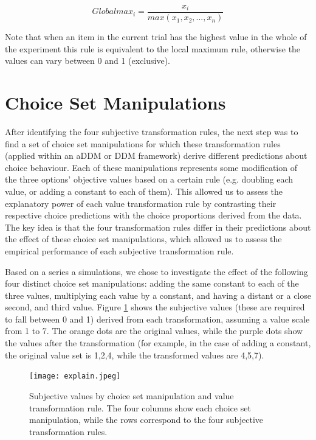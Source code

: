 \documentclass[11pt,a4paper]{article}
\begin{document}
\begin{equation}
Globalmax_{i}=\frac{x_i}{max(x_1,x_2,...,x_n)}
\label{eq:globmax}
\end{equation}

Note that when an item in the current trial has the highest value in the whole of the experiment this rule is equivalent to the local maximum rule, otherwise the values can vary between 0 and 1 (exclusive). 

\section{Choice Set Manipulations} \label{chap1choicesetman}

After identifying the four subjective transformation rules, the next step was to find a set of choice set manipulations for which these transformation rules (applied within an aDDM or DDM framework) derive different predictions about choice behaviour. Each of these manipulations represents some modification of the three options' objective values based on a certain rule (e.g. doubling each value, or adding a constant to each of them). This allowed us to assess the explanatory power of each value transformation rule by contrasting their respective choice predictions with the choice proportions derived from the data. The key idea is that the four transformation rules differ in their predictions about the effect of these choice set manipulations, which allowed us to assess the empirical performance of each subjective transformation rule.

Based on a series a simulations, we chose to investigate the effect of the following four distinct choice set manipulations: adding the same constant to each of the three values, multiplying each value by a constant, and having a distant or a close second, and third value. Figure \ref{fig:choicesetmanip} shows the subjective values (these are required to fall between 0 and 1) derived from each transformation, assuming a value scale from 1 to 7. The orange dots are the original values, while the purple dots show the values after the transformation (for example, in the case of adding a constant, the original value set is 1,2,4, while the transformed values are 4,5,7).

\begin{figure}
\captionsetup{justification=centering}
\centering
\caption{Subjective values by choice set manipulation and value transformation rule. The four columns show each choice set manipulation, while the rows correspond to the four subjective transformation rules.}
\texttt{[image: explain.jpeg]}
\label{fig:choicesetmanip}
\end{figure}
\end{document}

